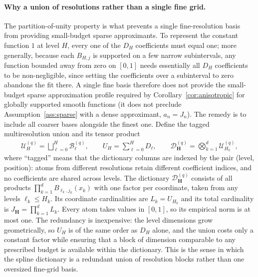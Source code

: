 \paragraph*{Why a union of resolutions rather than a single fine grid.}
The partition-of-unity property is what prevents a single fine-resolution basis from providing small-budget sparse approximants. To represent the constant function $1$ at level $H$, every one of the $D_H$ coefficients must equal one; more generally, because each $B_{H,j}$ is supported on a few narrow subintervals, any function bounded away from zero on $[0,1]$ needs essentially all $D_H$ coefficients to be non-negligible, since setting the coefficients over a subinterval to zero abandons the fit there. A single fine basis therefore does not provide the small-budget sparse approximation profile required by Corollary~\ref{cor:anisotropic} for globally supported smooth functions (it does not preclude Assumption~\ref{ass:sparse} with a dense approximant, $a_n=J_n$). The remedy is to include all coarser bases alongside the finest one. Define the tagged multiresolution union and its tensor product
\begin{align*}
\mathcal U_H^{(q)}=\bigsqcup_{\ell=0}^H\mathcal B_\ell^{(q)},
\qquad U_H=\sum_{\ell=0}^HD_\ell,
\qquad
\mathcal D_{\boldsymbol H}^{(q)}
=\bigotimes_{k=1}^d\mathcal U_{H_k}^{(q)},
\end{align*}
where ``tagged'' means that the dictionary columns are indexed by the pair (level, position): atoms from different resolutions retain different coefficient indices, and no coefficients are shared across levels. The dictionary $\mathcal D_{\boldsymbol H}^{(q)}$ consists of all products $\prod_{k=1}^dB_{\ell_k,j_k}(x_k)$ with one factor per coordinate, taken from any levels $\ell_k\leq H_k$. Its coordinate cardinalities are $L_k=U_{H_k}$ and its total cardinality is $J_{\boldsymbol H}=\prod_{k=1}^dL_k$. Every atom takes values in $[0,1]$, so its empirical norm is at most one. The redundancy is inexpensive: the level dimensions grow geometrically, so $U_H$ is of the same order as $D_H$ alone, and the union costs only a constant factor while ensuring that a block of dimension comparable to any prescribed budget is available within the dictionary. This is the sense in which the spline dictionary is a redundant union of resolution blocks rather than one oversized fine-grid basis.

